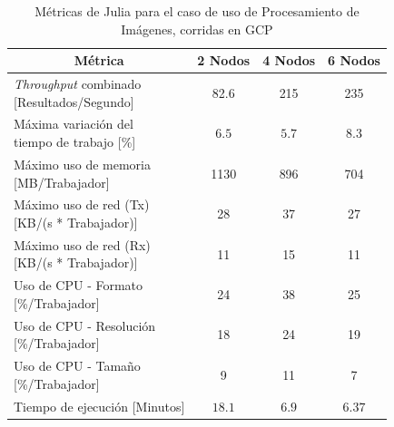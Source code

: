 \documentclass[11pt]{article}
\providecommand{\row}[1]{\parbox{150pt}{\setlength{\baselineskip}{0.2\baselineskip}\strut#1\strut}}
\newcommand{\ipcap}[2]{\caption{Métricas de #1 para el caso de uso de Procesamiento de Imágenes, corridas en #2}}
\newcommand{\english}[1]{\textit{#1}}
\begin{document}
\begin{table}[H]
\centering
\begin{tabular}{|l|c|c|c|}
\hline
\multicolumn{1}{|c|}{Métrica} & 2 Nodos & 4 Nodos & 6 Nodos \\ \hline
\row{\english{Throughput} combinado\\{[Resultados/Segundo]}} & 82.6 & 215 & 235 \\ \hline
\row{Máxima variación del \\ tiempo de trabajo {[}\%{]}} & $6.5$ & $5.7$ & $8.3$ \\ \hline
\row{Máximo uso de memoria \\ {[MB/Trabajador]}} & 1130 & 896 & 704 \\ \hline
\row{Máximo uso de red (Tx) \\ {[KB/(s * Trabajador)]}} & 28 & 37 & 27 \\ \hline
\row{Máximo uso de red (Rx) \\ {[KB/(s * Trabajador)]}} & 11 & 15 & 11 \\ \hline
\row{Uso de CPU - Formato\\{[\%/Trabajador]}} & 24 & 38 & 25 \\ \hline
\row{Uso de CPU - Resolución\\{[\%/Trabajador]}} & 18 & 24 & 19 \\ \hline
\row{Uso de CPU - Tamaño\\{[\%/Trabajador]}} & 9 & 11 & 7 \\ \hline
Tiempo de ejecución [Minutos] & $18.1$ & $6.9$ & $6.37$ \\ \hline
\end{tabular}
\ipcap{Julia}{GCP}
\end{table}
\end{document}
